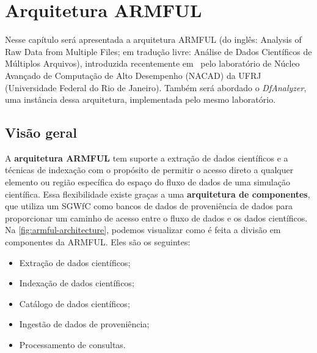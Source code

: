 
\chapter{Arquitetura ARMFUL}%
\label{chap:arquitetura-armful}

Nesse capítulo será apresentada a arquitetura  ARMFUL (do inglês: Analysis of Raw Data from Multiple Files; em tradução livre: Análise de Dados Científicos de Múltiplos Arquivos), introduzida recentemente em~\cite{silva2016situ,silva2017raw} pelo laboratório de  Núcleo Avançado de Computação de Alto Desempenho (NACAD) da  UFRJ (Universidade Federal do Rio de Janeiro). Também será abordado o \textit{DfAnalyzer}, uma instância dessa arquitetura, implementada pelo mesmo laboratório.

\section{Visão geral}

A \textbf{arquitetura ARMFUL} tem suporte a extração de dados científicos e a técnicas de indexação com o propósito de permitir o acesso direto a qualquer elemento ou região específica do espaço do fluxo de dados de uma simulação científica. Essa flexibilidade existe graças a uma \textbf{arquitetura de componentes}, que utiliza um SGWfC como bancos de dados de proveniência de dados para proporcionar um caminho de acesso entre o fluxo de dados e os dados científicos. Na \autoref{fig:armful-architecture}, podemos visualizar como é feita a divisão em componentes da ARMFUL. Eles são os seguintes:

\begin{itemize}
    \item Extração de dados científicos;
    \item Indexação de dados científicos;
    \item Catálogo de dados científicos;
    \item Ingestão de dados de proveniência;
    \item Processamento de consultas.
\end{itemize}


